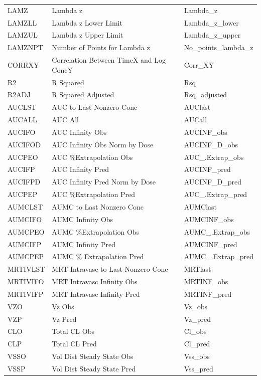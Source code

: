 \documentclass[12pt,]{krantz}
\theoremstyle{definition}
\theoremstyle{definition}
\theoremstyle{definition}
\theoremstyle{remark}
\begin{document}
\begin{longtable}[t]{lll}
LAMZ & Lambda z & Lambda\_z\\
\addlinespace
LAMZLL & Lambda z Lower Limit & Lambda\_z\_lower\\
LAMZUL & Lambda z Upper Limit & Lambda\_z\_upper\\
LAMZNPT & Number of Points for Lambda z & No\_points\_lambda\_z\\
CORRXY & Correlation Between TimeX and Log ConcY & Corr\_XY\\
R2 & R Squared & Rsq\\
\addlinespace
R2ADJ & R Squared Adjusted & Rsq\_adjusted\\
AUCLST & AUC to Last Nonzero Conc & AUClast\\
AUCALL & AUC All & AUCall\\
AUCIFO & AUC Infinity Obs & AUCINF\_obs\\
AUCIFOD & AUC Infinity Obs Norm by Dose & AUCINF\_D\_obs\\
\addlinespace
AUCPEO & AUC \%Extrapolation Obs & AUC\_.Extrap\_obs\\
AUCIFP & AUC Infinity Pred & AUCINF\_pred\\
AUCIFPD & AUC Infinity Pred Norm by Dose & AUCINF\_D\_pred\\
AUCPEP & AUC \%Extrapolation Pred & AUC\_.Extrap\_pred\\
AUMCLST & AUMC to Last Nonzero Conc & AUMClast\\
\addlinespace
AUMCIFO & AUMC Infinity Obs & AUMCINF\_obs\\
AUMCPEO & AUMC \%Extrapolation Obs & AUMC\_.Extrap\_obs\\
AUMCIFP & AUMC Infinity Pred & AUMCINF\_pred\\
AUMCPEP & AUMC \% Extrapolation Pred & AUMC\_.Extrap\_pred\\
MRTIVLST & MRT Intravasc to Last Nonzero Conc & MRTlast\\
\addlinespace
MRTIVIFO & MRT Intravasc Infinity Obs & MRTINF\_obs\\
MRTIVIFP & MRT Intravasc Infinity Pred & MRTINF\_pred\\
VZO & Vz Obs & Vz\_obs\\
VZP & Vz Pred & Vz\_pred\\
CLO & Total CL Obs & Cl\_obs\\
\addlinespace
CLP & Total CL Pred & Cl\_pred\\
VSSO & Vol Dist Steady State Obs & Vss\_obs\\
VSSP & Vol Dist Steady State Pred & Vss\_pred\\
\bottomrule
\end{longtable}
\end{document}
